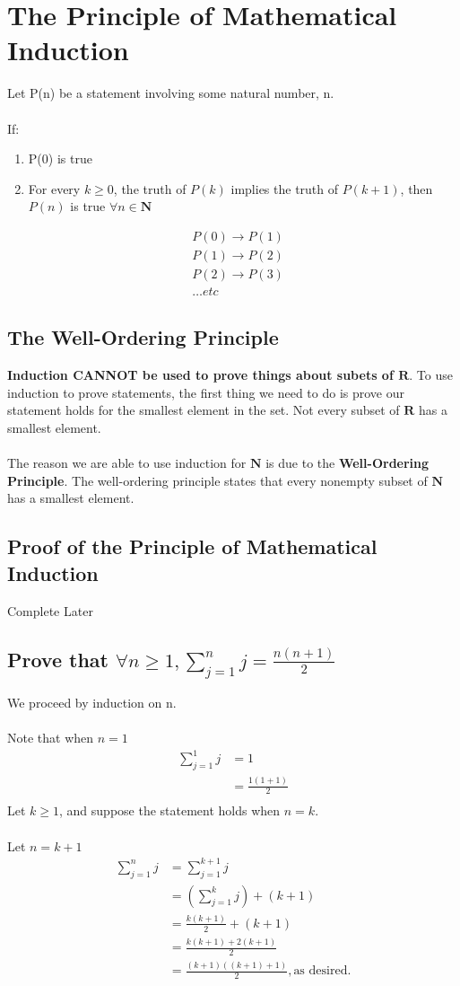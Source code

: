 \documentclass[12pt]{article}
\begin{document}
	\section{The Principle of Mathematical Induction}
	Let P(n) be a statement involving some natural number, n.\\\\
	If:
	\begin{enumerate}
		\item P(0) is true
		\item For every $k \geq 0$, the truth of $P(k)$ implies the truth of $P(k + 1)$, then $P(n)$ is true $\forall n \in \mathbf{N}$
	\end{enumerate}
	\begin{align*}
		&P(0) \rightarrow P(1) \\
		&P(1) \rightarrow P(2) \\
		&P(2) \rightarrow P(3) \\
		&\ldots etc
	\end{align*}
	\subsection{The Well-Ordering Principle}
	\textbf{Induction CANNOT be used to prove things about subets of $\mathbf{R}$}. To use induction to prove statements, the first thing we need to do is prove our statement holds for the smallest element in the set. Not every subset of $\mathbf{R}$ has a smallest element.\\\\
	The reason we are able to use induction for $\mathbf{N}$ is due to the \textbf{Well-Ordering Principle}. The well-ordering principle states that every nonempty subset of $\mathbf{N}$ has a smallest element.
	\subsection{Proof of the Principle of Mathematical Induction}
	Complete Later
	\subsection{Prove that $\forall n \geq 1, \sum_{j = 1}^n j = \frac{n(n + 1)}{2}$}
	We proceed by induction on n. \\\\
	Note that when $n = 1$
	\begin{align*}
		\sum_{j = 1}^{1} j &= 1 \\
						   &= \frac{1(1 + 1)}{2} \\
	\end{align*}
	Let $k \geq 1$, and suppose the statement holds when $n = k$. \\\\
	Let $n = k + 1$
	\begin{align*}
		\sum_{j = 1}^{n} j &= \sum_{j = 1}^{k + 1} j \\
						   &= \left(\sum_{j = 1}^{k} j \right) + (k + 1) \\
						   &= \frac{k(k + 1)}{2} + (k + 1) \\
						   &= \frac{k(k + 1) + 2(k + 1)}{2} \\
						   &= \frac{(k + 1)((k + 1) + 1)}{2}, \text{as desired.}
	\end{align*}
\end{document}

